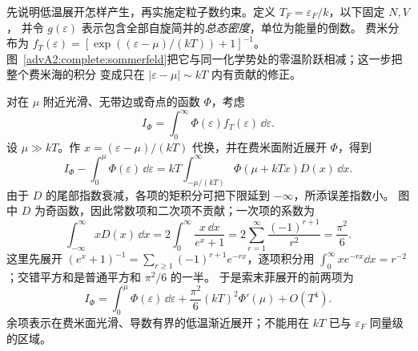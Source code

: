 先说明低温展开怎样产生，再实施定粒子数约束。定义 $T_F=\varepsilon_F/k$，以下固定 $N,V$，
并令 $g(\varepsilon)$ 表示包含全部自旋简并的\emph{总态密度}，单位为能量的倒数。
费米分布为 $f_T(\varepsilon)=[\exp((\varepsilon-\mu)/(kT))+1]^{-1}$。
图~\ref{advA2:complete:sommerfeld}把它与同一化学势处的零温阶跃相减；这一步把整个费米海的积分
变成只在 $|\varepsilon-\mu|\sim kT$ 内有贡献的修正。

\begin{qualityfigure}
\centering
{}
\end{qualityfigure}

对在 $\mu$ 附近光滑、无带边或奇点的函数 $\Phi$，考虑
\[
 I_\Phi=\int_0^\infty\Phi(\varepsilon)f_T(\varepsilon)\,\dd\varepsilon.
\]
设 $\mu\gg kT$。作 $x=(\varepsilon-\mu)/(kT)$ 代换，并在费米面附近展开 $\Phi$，得到
\[
 I_\Phi-\int_0^\mu\Phi(\varepsilon)\,\dd\varepsilon
 =kT\int_{-\mu/(kT)}^\infty\Phi(\mu+kTx)D(x)\,\dd x.
\]
由于 $D$ 的尾部指数衰减，各项的矩积分可把下限延到 $-\infty$，所添误差指数小。
图中 $D$ 为奇函数，因此常数项和二次项不贡献；一次项的系数为
\[
 \int_{-\infty}^{\infty}xD(x)\,\dd x
 =2\int_0^\infty\frac{x\,\dd x}{e^x+1}
 =2\sum_{r=1}^\infty\frac{(-1)^{r+1}}{r^2}
 =\frac{\pi^2}{6}.
\]
这里先展开 $(e^x+1)^{-1}=\sum_{r\ge1}(-1)^{r+1}e^{-rx}$，逐项积分用
$\int_0^\infty xe^{-rx}\dd x=r^{-2}$；交错平方和是普通平方和 $\pi^2/6$ 的一半。
于是索末菲展开的前两项为
\begin{equation}
 I_\Phi=\int_0^\mu\Phi(\varepsilon)\,\dd\varepsilon
 +\frac{\pi^2}{6}(kT)^2\Phi'(\mu)+O(T^4).
 \label{advA2:eq:complete-sommerfeld}
\end{equation}
余项表示在费米面光滑、导数有界的低温渐近展开；不能用在 $kT$ 已与 $\varepsilon_F$ 同量级的区域。

